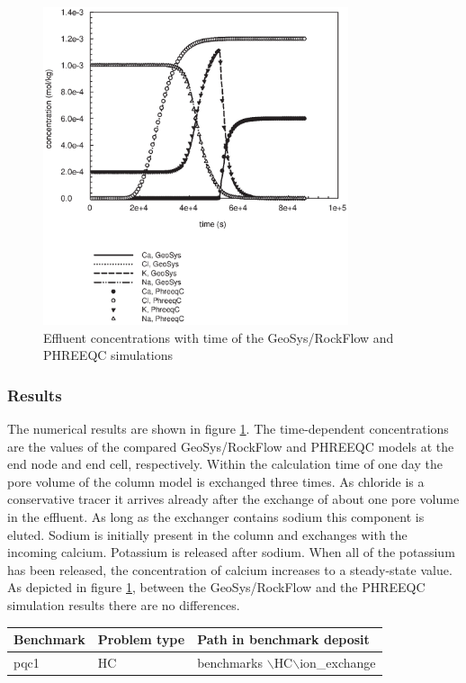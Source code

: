 \begin{figure}[htbp]
\centering
\includegraphics[width=0.8\textwidth]{C/figures/fig513.EPS}
\caption{Effluent concentrations  with time of the GeoSys/RockFlow and PHREEQC simulations}
\label{fig513}
\end{figure}

\subsubsection*{Results}

The numerical results are shown in figure \ref{fig513}. The time-dependent concentrations are the values of the compared GeoSys/RockFlow and PHREEQC models at the end node and end cell, respectively. Within the calculation time of one day the pore volume of the column model is exchanged three times. As chloride is a conservative tracer it arrives already after the exchange of about one pore volume in the effluent. As long as the exchanger contains sodium this component is eluted. Sodium is initially present in the column and exchanges with the incoming calcium. Potassium is released after sodium. When all of the potassium has been released, the concentration of calcium increases to a steady-state value. As depicted in figure \ref{fig513}, between the GeoSys/RockFlow and the PHREEQC simulation results there are no differences.

\begin{tabular}{|l|l|l|}
\hline
Benchmark & Problem type	& Path in benchmark deposit \\
\hline	
pqc1	& HC	& benchmarks $\backslash$HC$\backslash$ion\_exchange \\
\hline	
\end{tabular}
